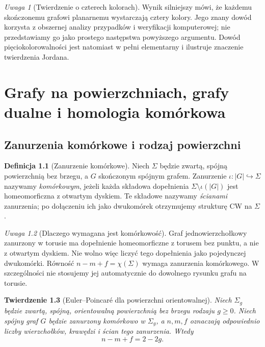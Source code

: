 \documentclass[11pt,a4paper]{report}
\numberwithin{equation}{section}
\theoremstyle{plain}
\newtheorem{twierdzenie}{Twierdzenie}[section]
\theoremstyle{definition}
\newtheorem{definicja}[twierdzenie]{Definicja}
\theoremstyle{remark}
\newtheorem{uwaga}[twierdzenie]{Uwaga}
\begin{document}
\begin{uwaga}[Twierdzenie o czterech kolorach]
Wynik silniejszy mówi, że każdemu skończonemu grafowi planarnemu
wystarczają cztery kolory. Jego znany dowód korzysta
z obszernej analizy przypadków i weryfikacji komputerowej;
nie przedstawiamy go jako prostego następstwa powyższego
argumentu. Dowód pięciokolorowalności jest natomiast
w pełni elementarny i ilustruje znaczenie twierdzenia Jordana.
\end{uwaga}


\chapter{Grafy na powierzchniach, grafy dualne i homologia komórkowa}
\label{ch:tg-powierzchnie}

\section{Zanurzenia komórkowe i rodzaj powierzchni}
\label{sec:tg-cellular-surface}

\begin{definicja}[Zanurzenie komórkowe]
Niech $\Sigma$ będzie zwartą, spójną powierzchnią bez brzegu,
a $G$ skończonym spójnym grafem. Zanurzenie
$\iota:|G|\hookrightarrow\Sigma$ nazywamy \emph{komórkowym},
jeżeli każda składowa dopełnienia $\Sigma\setminus\iota(|G|)$
jest homeomorficzna z otwartym dyskiem. Te składowe nazywamy
\emph{ścianami} zanurzenia; po dołączeniu ich jako dwukomórek
otrzymujemy strukturę CW na $\Sigma$.
\end{definicja}

\begin{uwaga}[Dlaczego wymagana jest komórkowość]
Graf jednowierzchołkowy zanurzony w torusie ma dopełnienie
homeomorficzne z torusem bez punktu, a nie z otwartym dyskiem.
Nie wolno więc liczyć tego dopełnienia jako pojedynczej
dwukomórki. Równość $n-m+f=\chi(\Sigma)$ wymaga
zanurzenia komórkowego. W szczególności nie stosujemy jej
automatycznie do dowolnego rysunku grafu na torusie.
\end{uwaga}

\begin{twierdzenie}[Euler--Poincaré dla powierzchni orientowalnej]
\label{thm:tg-surface-euler}
Niech $\Sigma_g$ będzie zwartą, spójną, orientowalną powierzchnią
bez brzegu rodzaju $g\ge0$. Niech spójny graf $G$ będzie
zanurzony komórkowo w $\Sigma_g$, a $n,m,f$ oznaczają
odpowiednio liczby wierzchołków, krawędzi i ścian tego zanurzenia.
Wtedy
\[
 n-m+f=2-2g.
\]
\end{twierdzenie}
\end{document}
